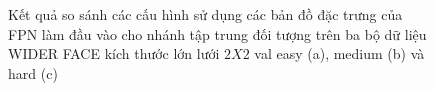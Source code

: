 {    \begin{figure}[H]
        \centering
        \caption{Kết quả so sánh các cấu hình sử dụng các bản đồ đặc trưng của FPN làm đầu vào cho nhánh tập trung đối tượng trên ba bộ dữ liệu WIDER FACE kích thước lớn lưới $2 X 2$ val easy (a), medium (b) và hard (c)}
        \label{fig:retinafocus_widerface_4k_val_fpn}
    \end{figure}

}
